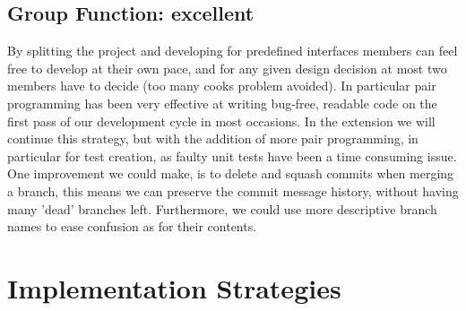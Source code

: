 \documentclass[11pt]{article}
\begin{document}
    \subsection*{Group Function: \textcolor{OliveGreen}{excellent}}
        By splitting the project and developing for predefined interfaces members can feel free to develop at their own pace, and for any given design decision at most two members have to decide (too many cooks problem avoided).
        In particular pair programming has been very effective at writing bug-free, readable code on the first pass of our development cycle in most occasions.
        \newline\newline
        In the extension we will continue this strategy, but with the addition of more pair programming, in particular for test creation, as faulty unit tests have been a time consuming issue.
        \newline\newline
        One improvement we could make, is to delete and squash commits when merging a branch, this means we can preserve the commit message history, without having many 'dead' branches left. Furthermore, we could use more descriptive branch names to ease confusion as for their contents.

\section{Implementation Strategies}
\end{document}
